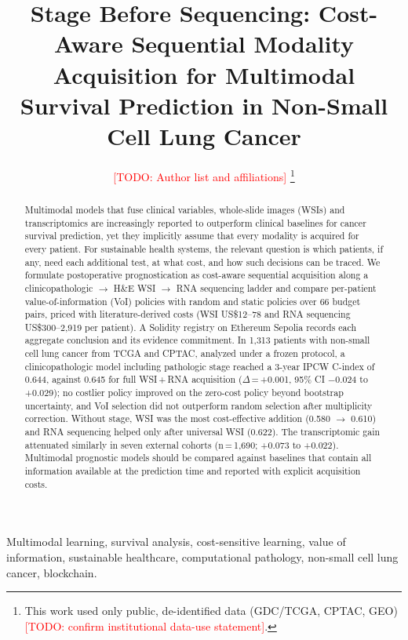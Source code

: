 \documentclass[journal,twoside]{IEEEtran}
\newcommand{\todo}[1]{\textcolor{red}{[TODO: #1]}}
\begin{document}
\title{Stage Before Sequencing: Cost-Aware Sequential Modality Acquisition for Multimodal Survival Prediction in Non-Small Cell Lung Cancer}

\author{\todo{Author list and affiliations}%
\thanks{This work used only public, de-identified data (GDC/TCGA, CPTAC, GEO) \todo{confirm institutional data-use statement}.}%
}

\maketitle

\begin{abstract}
Multimodal models that fuse clinical variables, whole-slide images (WSIs) and transcriptomics are increasingly reported to outperform clinical baselines for cancer survival prediction, yet they implicitly assume that every modality is acquired for every patient. For sustainable health systems, the relevant question is which patients, if any, need each additional test, at what cost, and how such decisions can be traced. We formulate postoperative prognostication as cost-aware sequential acquisition along a clinicopathologic $\rightarrow$ H\&E WSI $\rightarrow$ RNA sequencing ladder and compare per-patient value-of-information (VoI) policies with random and static policies over 66 budget pairs, priced with literature-derived costs (WSI US\$12--78 and RNA sequencing US\$300--2,919 per patient). A Solidity registry on Ethereum Sepolia records each aggregate conclusion and its evidence commitment. In 1,313 patients with non-small cell lung cancer from TCGA and CPTAC, analyzed under a frozen protocol, a clinicopathologic model including pathologic stage reached a 3-year IPCW C-index of 0.644, against 0.645 for full WSI\,+\,RNA acquisition ($\Delta$\,=\,+0.001, 95\% CI $-$0.024 to +0.029); no costlier policy improved on the zero-cost policy beyond bootstrap uncertainty, and VoI selection did not outperform random selection after multiplicity correction. Without stage, WSI was the most cost-effective addition (0.580 $\rightarrow$ 0.610) and RNA sequencing helped only after universal WSI (0.622). The transcriptomic gain attenuated similarly in seven external cohorts (n\,=\,1,690; +0.073 to +0.022). Multimodal prognostic models should be compared against baselines that contain all information available at the prediction time and reported with explicit acquisition costs.
\end{abstract}

\begin{IEEEkeywords}
Multimodal learning, survival analysis, cost-sensitive learning, value of information, sustainable healthcare, computational pathology, non-small cell lung cancer, blockchain.
\end{IEEEkeywords}
\end{document}
